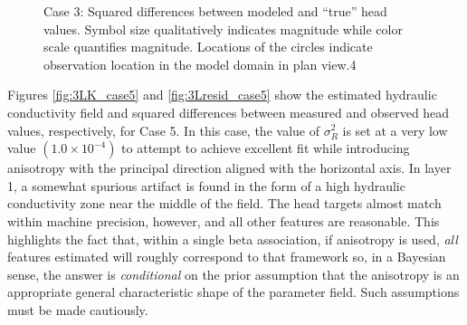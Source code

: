 \documentclass[11pt,oneside,onecolumn]{usgsreport}
\begin{document}
\begin{appendix}
\begin{figure}[!t]
\caption{\label{fig:3Lresid_case3}Case 3: Squared differences between modeled
and ``true'' head values. Symbol size qualitatively indicates magnitude
while color scale quantifies magnitude. Locations of the circles indicate
observation location in the model domain in plan view.4}
\end{figure}


Figures \ref{fig:3LK_case5} and \ref{fig:3Lresid_case5} show the
estimated hydraulic conductivity field and squared differences between
measured and observed head values, respectively, for Case 5. In this
case, the value of $\sigma_{R}^{2}$ is set at a very low value $\left(1.0\times10^{-4}\right)$
to attempt to achieve excellent fit while introducing anisotropy with
the principal direction aligned with the horizontal axis. In layer
1, a somewhat spurious artifact is found in the form of a high hydraulic
conductivity zone near the middle of the field. The head targets almost
match within machine precision, however, and all other features are
reasonable. This highlights the fact that, within a single beta association,
if anisotropy is used, \emph{all }features estimated will roughly
correspond to that framework so, in a Bayesian sense, the answer is
\emph{conditional }on the prior assumption that the anisotropy is
an appropriate general characteristic shape of the parameter field.
Such assumptions must be made cautiously.


\end{appendix}
\end{document}
